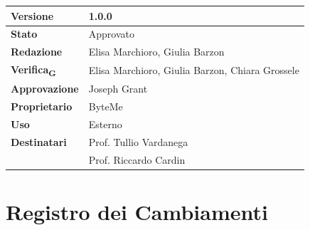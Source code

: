 \documentclass[11pt,a4paper]{article}
\newcommand{\gls}[1]{#1\textsubscript{G}}
\begin{document}
\begin{titlepage}
    \begin{table}[H]
        \centering
        \begin{tabular}{|l|p{5cm}|}
            \hline
            \textbf{Versione} & 1.0.0 \\
            \hline
            \textbf{Stato} & Approvato \\
            \hline
            \textbf{Redazione} & Elisa Marchioro, Giulia Barzon \\
            \hline
            \textbf{\gls{Verifica}} & Elisa Marchioro, Giulia Barzon, Chiara Grossele \\
            \hline
            \textbf{Approvazione} & Joseph Grant \\
            \hline
            \textbf{Proprietario} & ByteMe \\
            \hline
            \textbf{Uso} & Esterno \\
            \hline
            \textbf{Destinatari} & Prof. Tullio Vardanega \\ & Prof. Riccardo Cardin \\
            \hline
        \end{tabular}
    \end{table}
    
    \vfill
\end{titlepage}

\thispagestyle{empty}
\section*{Registro dei Cambiamenti}
\end{document}
